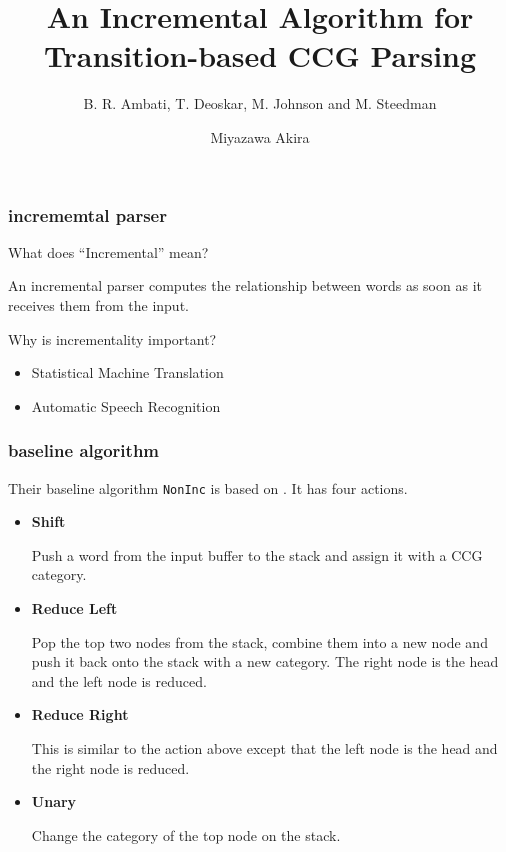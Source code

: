 \documentclass[10pt]{beamer}
\title{\LARGE An Incremental Algorithm for Transition-based CCG Parsing}
\subtitle{\normalsize B. R. Ambati, T. Deoskar, M. Johnson and M. Steedman}
\author{Miyazawa Akira}
\institute{The Graduate University For Advanced Studies / National Institute of Informatics}
\begin{document}
\maketitle

\begin{frame}
    \frametitle{incrememtal parser}
    \nocite{ambati2015}
    What does ``Incremental'' mean?

    \begin{indentation}{10pt}{0pt}
        An incremental parser
        computes the relationship between words as soon as
        it receives them from the input.
    \end{indentation}

    \bigskip

    Why is incrementality important?
    \begin{itemize}
        \item Statistical Machine Translation
        \item Automatic Speech Recognition
    \end{itemize}
\end{frame}

\begin{frame}
    \frametitle{baseline algorithm}
    Their baseline algorithm \texttt{NonInc} is based on \cite{zhang2011}.
    It has four actions.
    \begin{itemize}
        \item \textbf{Shift}

            Push a word from the input buffer to the stack and assign it with a CCG category.

        \item \textbf{Reduce Left}

            Pop the top two nodes from the stack, combine them into a new node and push it back onto the stack with a new category.
            The right node is the head and the left node is reduced.

        \item \textbf{Reduce Right}

            This is similar to the action above except that the left node is the head and the right node is reduced.

        \item \textbf{Unary}

            Change the category of the top node on the stack.
    \end{itemize}
\end{frame}
\end{document}
